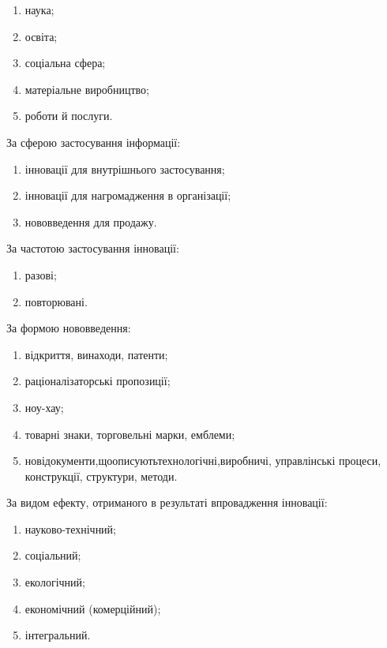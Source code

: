 \begin{enumerate}
	\item наука;
	\item освіта;
	\item соціальна сфера;
	\item матеріальне виробництво;
	\item роботи й послуги.
\end{enumerate}

За сферою застосування інформації:

\begin{enumerate}
	\item інновації для внутрішнього застосування;
	\item інновації для нагромадження в організації;
	\item нововведення для продажу.
\end{enumerate}

За частотою застосування інновації:

\begin{enumerate}
	\item разові;
	\item повторювані.
\end{enumerate}

За формою нововведення:

\begin{enumerate}
	\item відкриття, винаходи, патенти;
	\item раціоналізаторські пропозиції;
	\item ноу-хау;
	\item товарні знаки, торговельні марки, емблеми;
	\item нові\hfill документи,\hfill що\hfill описують\hfill технологічні,\hfill виробничі,\newline \hspace*{-18mm} управлінські процеси, конструкції, структури, методи.
\end{enumerate}

За видом ефекту, отриманого в результаті впровадження інновації:

\begin{enumerate}
	\item науково-технічний;
	\item соціальний;
	\item екологічний;
	\item економічний (комерційний);
	\item інтегральний.
\end{enumerate}

